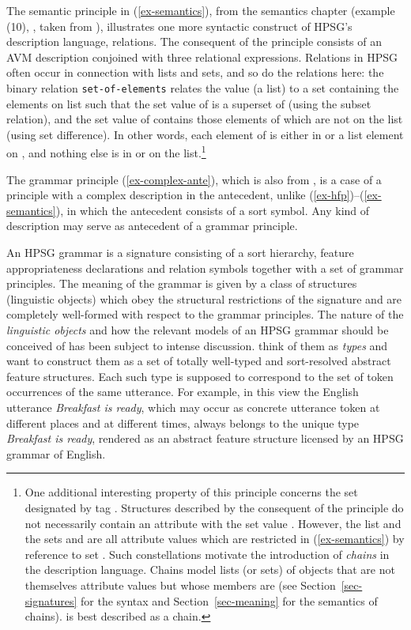 \documentclass[output=paper
                ,modfonts
                ,nonflat
	        ,collection
	        ,collectionchapter
	        ,collectiontoclongg
 	        ,biblatex
                ,babelshorthands
                ,newtxmath
                ,draftmode
                ,colorlinks, citecolor=brown
]{./langsci/langscibook}
\begin{document}
{{The semantic principle in (\ref{ex-semantics}), from the
semantics chapter (example (10), , taken
from \cite[420]{PY98a-u-auf-Platte-gedruckt}),
illustrates one more syntactic
construct of HPSG's description language, relations. The consequent of
the principle consists of an AVM description conjoined with three
relational expressions.  Relations in HPSG often occur in
connection with lists and sets, and so do the relations here: the
binary relation \texttt{set-of-elements} relates the  value
(a list) to a set  containing the elements on list  such
that the set value  of  is a superset of 
(using the subset relation), and the set value  of 
contains those elements of  which are not on the
 list (using set difference). In other words,
each element of  is either in \mbox{} or
a list element on , and nothing else is in 
or on the  list.\footnote{One
  additional interesting property of this principle concerns the set
  designated by tag . Structures described by the consequent of
  the principle do not necessarily contain an attribute with the set
  value . However, the list  and the sets  and  are
  all attribute values which are restricted in (\ref{ex-semantics}) by reference to set
  . Such constellations motivate the introduction of
  \emph{chains} in the description language. Chains model lists (or
  sets) of objects that are not themselves attribute values but whose
  members are (see Section~\ref{sec-signatures} for the syntax and
  Section~\ref{sec-meaning} for the semantics of chains).  is best
  described as a chain.}

The grammar principle (\ref{ex-complex-ante}), which is also from
\cite[421]{PY98a-u-auf-Platte-gedruckt}, is a case of a principle
with a complex description in the antecedent,
unlike (\ref{ex-hfp})--(\ref{ex-semantics}), in which the antecedent
consists of a sort symbol. Any kind of description
may serve as antecedent of a grammar principle.

An HPSG grammar is a signature consisting of a sort hierarchy, feature
appropriateness declarations and relation symbols together with a set
of grammar principles. The meaning of the grammar is given by a class
of structures (linguistic objects) which obey the structural
restrictions of the signature and are completely well-formed with
respect to the grammar principles. The nature of the \emph{linguistic
  objects} and how the relevant models of an HPSG grammar should be
conceived of has been subject to intense
discussion. \cite[8--9]{PollardSag1994} think of them as \emph{types} and
want to construct them as a set of totally well-typed and
sort-resolved abstract feature structures. Each such type is supposed
to correspond to the set of token occurrences of the same utterance. For
example, in this view the English utterance \emph{Breakfast is ready},
which may occur as concrete utterance token
at different places and at different times, always belongs to the
unique type \emph{Breakfast is ready}, rendered as an abstract feature
structure licensed by an HPSG grammar of English.

}}
\end{document}
